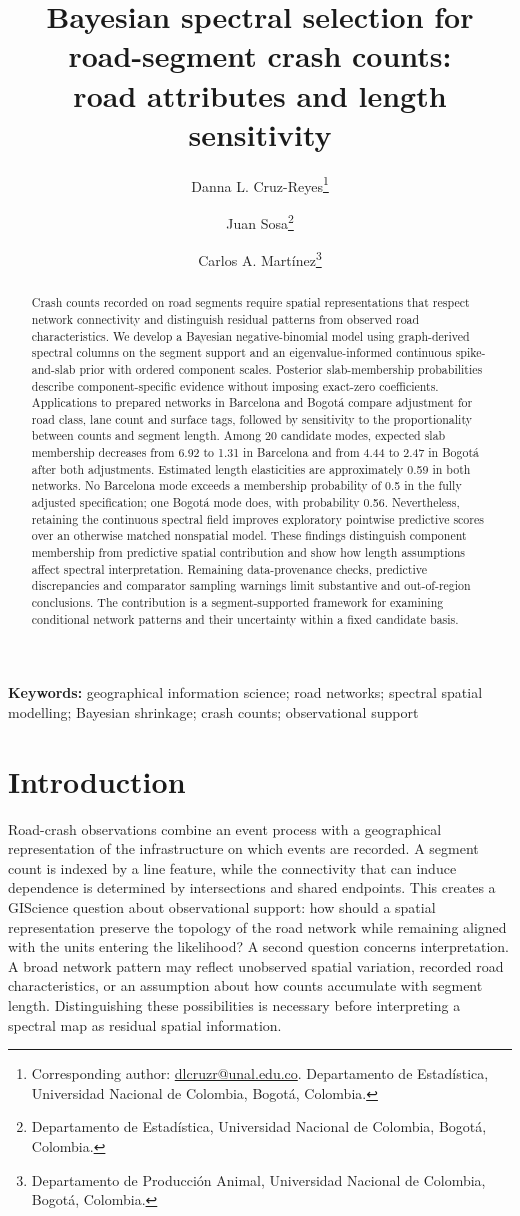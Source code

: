 \documentclass[11pt]{article}
\title{Bayesian spectral selection for road-segment crash counts:\\road attributes and length sensitivity}
\author{Danna L. Cruz-Reyes\thanks{Corresponding author: \href{mailto:dlcruzr@unal.edu.co}{dlcruzr@unal.edu.co}. Departamento de Estad\'istica, Universidad Nacional de Colombia, Bogot\'a, Colombia.}
\and Juan Sosa\thanks{Departamento de Estad\'istica, Universidad Nacional de Colombia, Bogot\'a, Colombia.}
\and Carlos A. Mart\'inez\thanks{Departamento de Producci\'on Animal, Universidad Nacional de Colombia, Bogot\'a, Colombia.}}
\date{}
\begin{document}
\maketitle
\begin{abstract}
Crash counts recorded on road segments require spatial representations that respect network connectivity and distinguish residual patterns from observed road characteristics. We develop a Bayesian negative-binomial model using graph-derived spectral columns on the segment support and an eigenvalue-informed continuous spike-and-slab prior with ordered component scales. Posterior slab-membership probabilities describe component-specific evidence without imposing exact-zero coefficients. Applications to prepared networks in Barcelona and Bogot\'a compare adjustment for road class, lane count and surface tags, followed by sensitivity to the proportionality between counts and segment length. Among 20 candidate modes, expected slab membership decreases from 6.92 to 1.31 in Barcelona and from 4.44 to 2.47 in Bogot\'a after both adjustments. Estimated length elasticities are approximately 0.59 in both networks. No Barcelona mode exceeds a membership probability of 0.5 in the fully adjusted specification; one Bogot\'a mode does, with probability 0.56. Nevertheless, retaining the continuous spectral field improves exploratory pointwise predictive scores over an otherwise matched nonspatial model. These findings distinguish component membership from predictive spatial contribution and show how length assumptions affect spectral interpretation. Remaining data-provenance checks, predictive discrepancies and comparator sampling warnings limit substantive and out-of-region conclusions. The contribution is a segment-supported framework for examining conditional network patterns and their uncertainty within a fixed candidate basis.
\end{abstract}
\noindent\textbf{Keywords:} geographical information science; road networks; spectral spatial modelling; Bayesian shrinkage; crash counts; observational support

\section{Introduction}
Road-crash observations combine an event process with a geographical representation of the infrastructure on which events are recorded. A segment count is indexed by a line feature, while the connectivity that can induce dependence is determined by intersections and shared endpoints. This creates a GIScience question about observational support: how should a spatial representation preserve the topology of the road network while remaining aligned with the units entering the likelihood? A second question concerns interpretation. A broad network pattern may reflect unobserved spatial variation, recorded road characteristics, or an assumption about how counts accumulate with segment length. Distinguishing these possibilities is necessary before interpreting a spectral map as residual spatial information.
\end{document}

